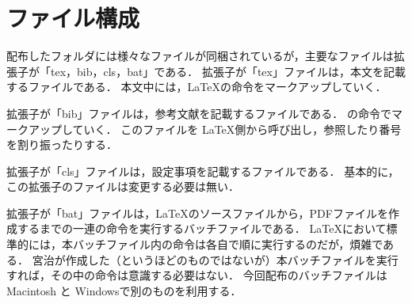 
\section{ファイル構成}
配布したフォルダには様々なファイルが同梱されているが，主要なファイルは拡張子が「tex，bib，cls，bat」である．
拡張子が「tex」ファイルは，本文を記載するファイルである．
本文中には，\LaTeX の命令をマークアップしていく．

拡張子が「bib」ファイルは，参考文献を記載するファイルである．
\BibTeX の命令でマークアップしていく．
このファイルを \LaTeX 側から呼び出し，参照したり番号を割り振ったりする．

拡張子が「cls」ファイルは，設定事項を記載するファイルである．
基本的に，この拡張子のファイルは変更する必要は無い．

拡張子が「bat」ファイルは，\LaTeX のソースファイルから，PDFファイルを作成するまでの一連の命令を実行するバッチファイルである．
\LaTeX において標準的には，本バッチファイル内の命令は各自で順に実行するのだが，煩雑である．
宮治が作成した（というほどのものではないが）本バッチファイルを実行すれば，その中の命令は意識する必要はない．
今回配布のバッチファイルは Macintosh と Windowsで別のものを利用する．

